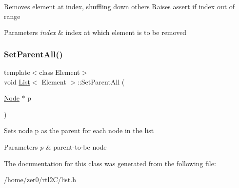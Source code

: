 Removes element at index, shuffling down others Raises assert if index out of range 
\begin{DoxyParams}{Parameters}
{\em index} & index at which element is to be removed \\
\hline
\end{DoxyParams}
\mbox{\label{class_list_ae461121db8d03106e92af9f87fa68b7d}} 
\subsubsection{\texorpdfstring{Set\+Parent\+All()}{SetParentAll()}}
{\footnotesize\ttfamily template$<$class Element$>$ \\
void \hyperlink{class_list}{List}$<$ Element $>$\+::Set\+Parent\+All (\begin{DoxyParamCaption}\item[{\hyperlink{class_node}{Node} $\ast$}]{p }\end{DoxyParamCaption})\hspace{0.3cm}{\ttfamily [inline]}}

Sets node p as the parent for each node in the list 
\begin{DoxyParams}{Parameters}
{\em p} & parent-\/to-\/be node \\
\hline
\end{DoxyParams}


The documentation for this class was generated from the following file\+:\begin{DoxyCompactItemize}
\item 
/home/zer0/rtl2\+C/list.\+h\end{DoxyCompactItemize}
